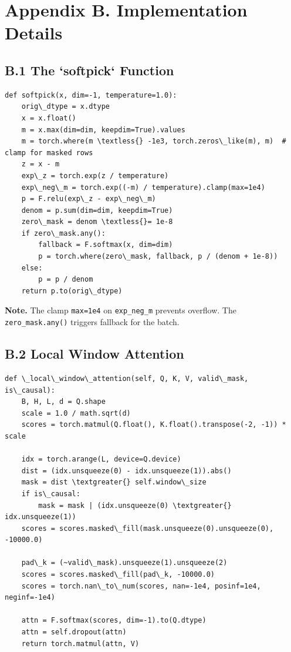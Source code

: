 
\section{Appendix B. Implementation Details}

\subsection{B.1 The `softpick` Function}

\begin{lstlisting}
def softpick(x, dim=-1, temperature=1.0):
    orig\_dtype = x.dtype
    x = x.float()
    m = x.max(dim=dim, keepdim=True).values
    m = torch.where(m \textless{} -1e3, torch.zeros\_like(m), m)  # clamp for masked rows
    z = x - m
    exp\_z = torch.exp(z / temperature)
    exp\_neg\_m = torch.exp((-m) / temperature).clamp(max=1e4)
    p = F.relu(exp\_z - exp\_neg\_m)
    denom = p.sum(dim=dim, keepdim=True)
    zero\_mask = denom \textless{}= 1e-8
    if zero\_mask.any():
        fallback = F.softmax(x, dim=dim)
        p = torch.where(zero\_mask, fallback, p / (denom + 1e-8))
    else:
        p = p / denom
    return p.to(orig\_dtype)
\end{lstlisting}

\textbf{Note.} The clamp \texttt{max=1e4} on \texttt{exp\_neg\_m} prevents overflow. The 
\texttt{zero\_mask.any()} triggers fallback for the batch.

\subsection{B.2 Local Window Attention}

\begin{lstlisting}
def \_local\_window\_attention(self, Q, K, V, valid\_mask, is\_causal):
    B, H, L, d = Q.shape
    scale = 1.0 / math.sqrt(d)
    scores = torch.matmul(Q.float(), K.float().transpose(-2, -1)) * scale
    
    idx = torch.arange(L, device=Q.device)
    dist = (idx.unsqueeze(0) - idx.unsqueeze(1)).abs()
    mask = dist \textgreater{} self.window\_size
    if is\_causal:
        mask = mask | (idx.unsqueeze(0) \textgreater{} idx.unsqueeze(1))
    scores = scores.masked\_fill(mask.unsqueeze(0).unsqueeze(0), -10000.0)
    
    pad\_k = (~valid\_mask).unsqueeze(1).unsqueeze(2)
    scores = scores.masked\_fill(pad\_k, -10000.0)
    scores = torch.nan\_to\_num(scores, nan=-1e4, posinf=1e4, neginf=-1e4)
    
    attn = F.softmax(scores, dim=-1).to(Q.dtype)
    attn = self.dropout(attn)
    return torch.matmul(attn, V)
\end{lstlisting}

